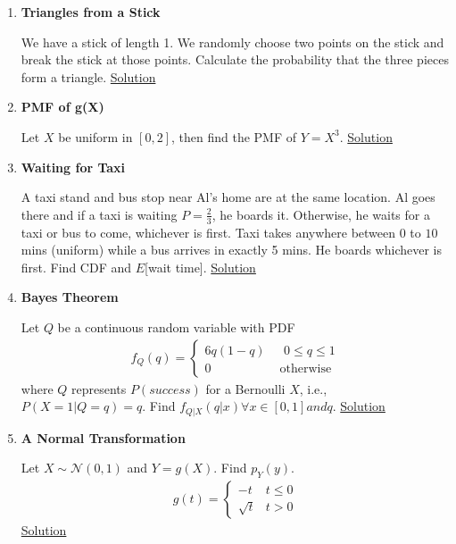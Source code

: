 \documentclass[../probability-notes.tex]{subfiles}
\begin{document}
\begin{enumerate}
    \item \hypertarget{q_trianglestick}{\textbf{Triangles from a Stick}}\newline
    We have a stick of length 1. We randomly choose two points on the stick and break the stick at those points. Calculate the probability that the three pieces form a triangle. \hyperlink{a_trianglestick}{Solution}


    \item \hypertarget{q_pmffn}{\textbf{PMF of g(X)}}\newline
    Let $X$ be uniform in $[0, 2]$, then find the PMF of $Y = X^{3}$. \hyperlink{a_pmffn}{Solution}

    \item \hypertarget{q_waittaxi}{\textbf{Waiting for Taxi}}\newline
    A taxi stand and bus stop near Al's home are at the same location. Al goes there and if a taxi is waiting $P=\frac{2}{3}$, he boards it. Otherwise, he waits for a taxi or bus to come, whichever is first. Taxi takes anywhere between $0$ to $10$ mins (uniform) while a bus arrives in exactly 5 mins. He boards whichever is first. Find CDF and $E$[wait time]. \hyperlink{a_waittaxi}{Solution}

    \item \hypertarget{q_bayes}{\textbf{Bayes Theorem}}\newline
    Let $Q$ be a continuous random variable with PDF
    \begin{align*}
        f_{Q}(q) = \begin{cases} 6q(1-q) &\mbox{ $0 \leq q \leq 1$}\\
                                 0 &\mbox{ otherwise} \end{cases}
    \end{align*}
    where $Q$ represents $P(success)$ for a Bernoulli $X$, i.e., $P(X=1|Q=q) = q$. Find $f_{Q|X}(q|x) \forall x \in [0,1] and q$. \hyperlink{a_bayes}{Solution}

    \item \hypertarget{q_normaltr}{\textbf{A Normal Transformation}}\newline
    Let $X \sim \mathcal{N}(0,1)$ and $Y = g(X)$. Find $p_{Y}(y)$.
    \begin{align*}
        g(t) = \begin{cases} -t &\mbox{$t \leq 0$}\\
                            \sqrt{t} &\mbox{$t > 0$} \end{cases}
    \end{align*}
    \hyperlink{a_normaltr}{Solution}


\end{enumerate}
\end{document}
